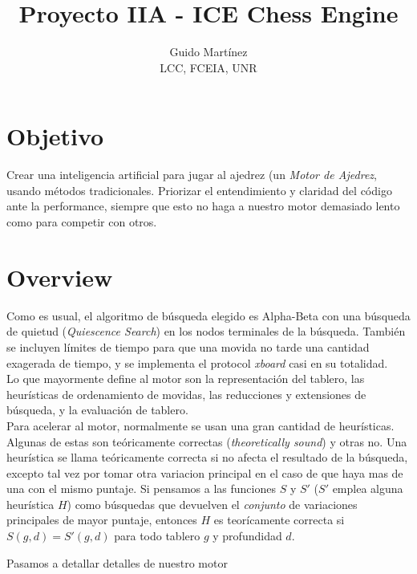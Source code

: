 \documentclass{article}
\begin{document}
\title{Proyecto IIA - ICE Chess Engine}

\author{Guido Martínez \\ LCC, FCEIA, UNR }

\maketitle

\section{Objetivo}

Crear una inteligencia artificial para jugar al ajedrez (un \emph {Motor
de Ajedrez}, usando métodos tradicionales. Priorizar el entendimiento
y claridad del código ante la performance, siempre que esto no haga a
nuestro motor demasiado lento como para competir con otros.

\section{Overview}

Como es usual, el algoritmo de búsqueda elegido es Alpha-Beta con una
búsqueda de quietud (\emph{Quiescence Search}) en los nodos terminales
de la búsqueda.
También se incluyen límites de tiempo para que una movida no tarde una
cantidad exagerada de tiempo, y se implementa el protocol \emph{xboard}
\cite{protocol} casi en su totalidad.
\\

Lo que mayormente define al motor son la representación del tablero,
las heurísticas de ordenamiento de movidas, las reducciones y
extensiones de búsqueda, y la evaluación de tablero.
\\

Para acelerar al motor, normalmente se usan una gran cantidad
de heurísticas. Algunas de estas son teóricamente correctas
(\emph{theoretically sound}) y otras no. Una heurística se llama
teóricamente correcta si no afecta el resultado de la búsqueda,
excepto tal vez por tomar otra variacion principal en el caso de que
haya mas de una con el mismo puntaje. Si pensamos a las funciones $S$ y
$S'$ ($S'$ emplea alguna heurística $H$) como búsquedas que devuelven
el \emph{conjunto} de variaciones principales de mayor puntaje, entonces
$H$ es teorícamente correcta si $S(g, d) = S'(g, d)$ para todo tablero
$g$ y profundidad $d$.

Pasamos a detallar detalles de nuestro motor
\\
\end{document}

